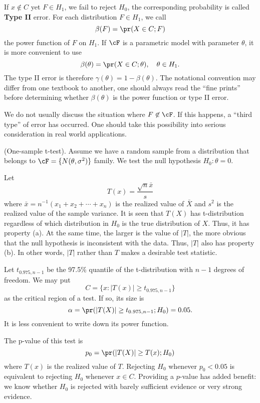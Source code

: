 If $x \not \in C$ yet $F \in H_1$, we fail to reject $H_0$, 
the corresponding probability is called {\bf Type II} error. 
For each distribution $F \in H_1$, we call
\[
\beta(F) = \pr (X \in C; F)
\]
the power function of $F$ on $H_1$.
If $\cF$ is a parametric model with parameter $\theta$, 
it is more convenient to use 
\[
\beta (\theta) = \pr ( X \in C; \theta), ~~~\theta \in H_1.
\]
The type II error is therefore $\gamma (\theta) = 1 - \beta(\theta)$.
The notational convention may differ from one textbook to another,
one should always read the ``fine prints'' before determining
whether $\beta(\theta)$ is the power function or type II error.

We do not usually discuss the situation where $F \not \in \cF$.
If this happens, a ``third type'' of error has occurred. 
One should take this possibility into serious consideration in
real world applications.

\begin{example}
\label{ex12.1}
(One-sample t-test). Assume we have a random sample
from a distribution that belongs to $\cF = \{ N(\theta, \sigma^2) \}$ family. 
We test the null hypothesis $H_0: \theta = 0$.

Let 
\[
T(x) = \frac{ \sqrt{n} \bar x}{ s}
\]
where $\bar x = n^{-1}(x_1 + x_2 + \cdots + x_n)$ is the realized
value of $\bar X$ and $s^2$ is the realized value of the sample
variance.
It is seen that $T(X)$ has t-distribution regardless of which distribution
in $H_0$ is the true distribution of $X$. Thus, it has property (a).
At the same time, the larger is the value of $|T|$, the more obvious
that the null hypothesis is inconsistent with the data. Thus, $|T|$ also
has property (b). In other words, $|T|$ rather than $T$ makes
a desirable test statistic.

Let $t_{0.975, n-1}$ be the 97.5\% quantile of the t-distribution 
with $n-1$ degrees of freedom. We may put
\[
C = \{ x:  |T(x)| \geq t_{0.975, n-1} \}
\]
as the critical region of a test. If so, its size is
\[
\alpha = \pr ( |T(X) | \geq t_{0.975, n-1}; H_0) = 0.05.
\]
It is less convenient to write down its power function. 

The p-value of this test is
\[
p_0 = \pr ( |T(X)| \geq T(x); H_0)
\]
where $T(x)$ is the realized value of $T$. Rejecting $H_0$
whenever $p_0 < 0.05$ is equivalent to rejecting $H_0$ whenever
$x \in C$. Providing a $p$-value has added benefit: we know whether
$H_0$ is rejected with barely sufficient evidence or very strong
evidence.
\end{example}

